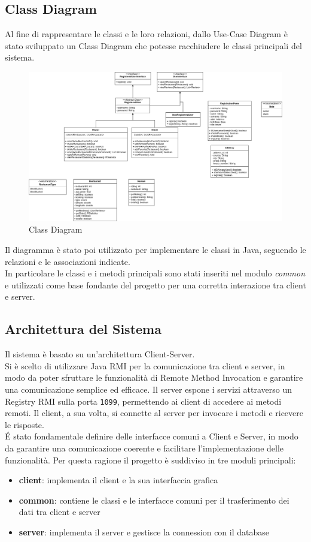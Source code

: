 \subsection{Class Diagram}
Al fine di rappresentare le classi e le loro relazioni, dallo 
Use-Case Diagram è stato sviluppato un Class Diagram che potesse 
racchiudere le classi principali del sistema.
\begin{figure}[H]
  \centering
  \includegraphics[width=\textwidth]{images/UML-Class-Diagram.png}
  \caption{Class Diagram}
  \label{fig:class-diagram}
\end{figure}
Il diagramma è stato poi utilizzato per implementare le classi 
in Java, seguendo le relazioni e le associazioni
indicate.\\
In particolare le classi e i metodi principali sono stati inseriti 
nel modulo \textit{common} e utilizzati come base fondante del progetto 
per una corretta interazione tra client e server.

\subsection{Architettura del Sistema}
Il sistema è basato su un'architettura Client-Server.\\
Si è scelto di utilizzare Java RMI per la comunicazione tra client e server,
in modo da poter sfruttare le funzionalità di Remote Method Invocation 
e garantire una comunicazione semplice ed efficace.
Il server espone i servizi attraverso un Registry RMI sulla porta 
\texttt{1099}, permettendo ai client di accedere ai metodi remoti.
Il client, a sua volta, si connette al server per invocare i metodi
e ricevere le risposte.\\

\'E stato fondamentale definire delle interfacce comuni a Client 
e Server, in modo da garantire una comunicazione coerente e
facilitare l'implementazione delle funzionalità.
Per questa ragione il progetto è suddiviso in tre moduli principali:
\begin{itemize}
  \item \textbf{client}: implementa il client e la sua interfaccia grafica
  \item \textbf{common}: contiene le classi e le interfacce comuni per il trasferimento dei dati tra client e server
  \item \textbf{server}: implementa il server e gestisce la connession con il database
\end{itemize}

